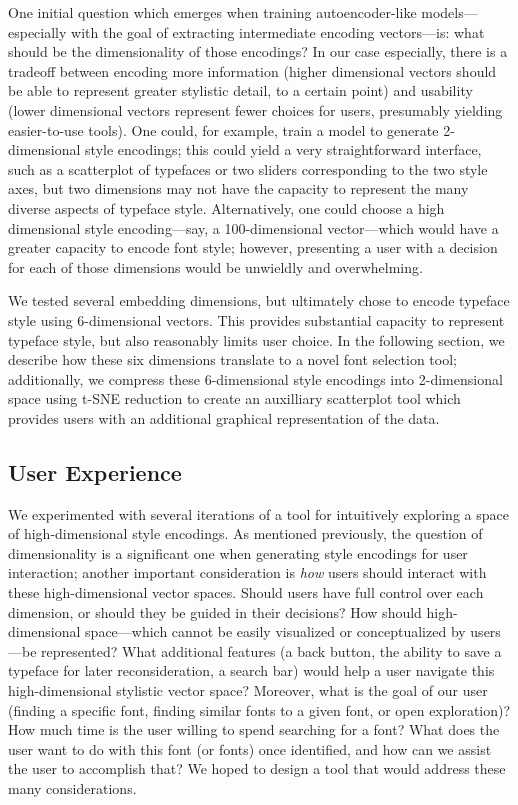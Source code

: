 One initial question which emerges when training autoencoder-like models---especially with the goal of extracting intermediate encoding vectors---is: what should be the dimensionality of those encodings? In our case especially, there is a tradeoff between encoding more information (higher dimensional vectors should be able to represent greater stylistic detail, to a certain point) and usability (lower dimensional vectors represent fewer choices for users, presumably yielding easier-to-use tools). One could, for example, train a model to generate 2-dimensional style encodings; this could yield a very straightforward interface, such as a scatterplot of typefaces or two sliders corresponding to the two style axes, but two dimensions may not have the capacity to represent the many diverse aspects of typeface style. Alternatively, one could choose a high dimensional style encoding—say, a 100-dimensional vector—which would have a greater capacity to encode font style; however, presenting a user with a decision for each of those dimensions would be unwieldly and overwhelming.

We tested several embedding dimensions, but ultimately chose to encode typeface style using 6-dimensional vectors. This provides substantial capacity to represent typeface style, but also reasonably limits user choice. In the following section, we describe how these six dimensions translate to a novel font selection tool; additionally, we compress these 6-dimensional style encodings into 2-dimensional space using t-SNE reduction to create an auxilliary scatterplot tool which provides users with an additional graphical representation of the data.

\subsection{User Experience}

We experimented with several iterations of a tool for intuitively exploring a space of high-dimensional style encodings. As mentioned previously, the question of dimensionality is a significant one when generating style encodings for user interaction; another important consideration is \textit{how} users should interact with these high-dimensional vector spaces. Should users have full control over each dimension, or should they be guided in their decisions? How should high-dimensional space—which cannot be easily visualized or conceptualized by users—be represented? What additional features (a back button, the ability to save a typeface for later reconsideration, a search bar) would help a user navigate this high-dimensional stylistic vector space? Moreover, what is the goal of our user (finding a specific font, finding similar fonts to a given font, or open exploration)? How much time is the user willing to spend searching for a font? What does the user want to do with this font (or fonts) once identified, and how can we assist the user to accomplish that? We hoped to design a tool that would address these many considerations.

